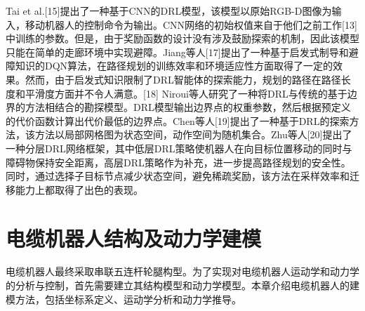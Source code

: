 \documentclass[
  oneside,
  degree=bachelor,
  fullwidthstop=false,
  fontset=fandol,
  times=false,
  minted=true,
  biblatex=true,
]{tongjithesis}
\begin{document}
Tai et al.[15]提出了一种基于CNN的DRL模型，该模型以原始RGB-D图像为输入，移动机器人的控制命令为输出。CNN网络的初始权值来自于他们之前工作[13]中训练的参数。但是，由于奖励函数的设计没有涉及鼓励探索的机制，因此该模型只能在简单的走廊环境中实现避障。Jiang等人[17]提出了一种基于启发式制导和避障知识的DQN算法，在路径规划的训练效率和环境适应性方面取得了一定的效果。然而，由于启发式知识限制了DRL智能体的探索能力，规划的路径在路径长度和平滑度方面并不令人满意。[18] Niroui等人研究了一种将DRL与传统的基于边界的方法相结合的勘探模型。DRL模型输出边界点的权重参数，然后根据预定义的代价函数计算出代价最低的边界点。Chen等人[19]提出了一种基于DRL的探索方法，该方法以局部网格图为状态空间，动作空间为随机集合。Zhu等人[20]提出了一种分层DRL网络框架，其中低层DRL策略使机器人在向目标位置移动的同时与障碍物保持安全距离，高层DRL策略作为补充，进一步提高路径规划的安全性。同时，通过选择子目标节点减少状态空间，避免稀疏奖励，该方法在采样效率和迁移能力上都取得了出色的表现。
\chapter{电缆机器人结构及动力学建模}\label{chap:model}

电缆机器人最终采取串联五连杆轮腿构型。为了实现对电缆机器人运动学和动力学的分析与控制，首先需要建立其结构模型和动力学模型。本章介绍电缆机器人的建模方法，包括坐标系定义、运动学分析和动力学推导。
\end{document}
